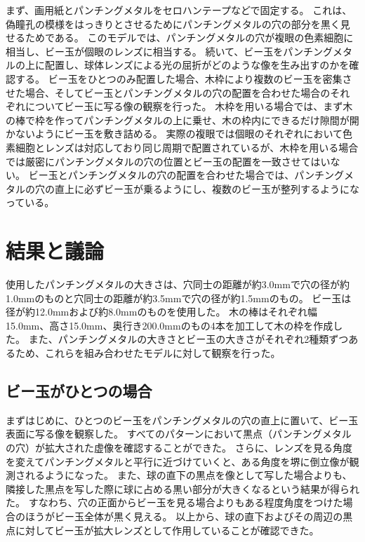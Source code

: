 \noindent
まず、画用紙とパンチングメタルをセロハンテープなどで固定する。
これは、偽瞳孔の模様をはっきりとさせるためにパンチングメタルの穴の部分を黒く見せるためである。
このモデルでは、パンチングメタルの穴が複眼の色素細胞に相当し、ビー玉が個眼のレンズに相当する。
続いて、ビー玉をパンチングメタルの上に配置し、球体レンズによる光の屈折がどのような像を生み出すのかを確認する。
ビー玉をひとつのみ配置した場合、木枠により複数のビー玉を密集させた場合、そしてビー玉とパンチングメタルの穴の配置を合わせた場合のそれぞれについてビー玉に写る像の観察を行った。
木枠を用いる場合では、まず木の棒で枠を作ってパンチングメタルの上に乗せ、木の枠内にできるだけ隙間が開かないようにビー玉を敷き詰める。
実際の複眼では個眼のそれぞれにおいて色素細胞とレンズは対応しており同じ周期で配置されているが、木枠を用いる場合では厳密にパンチングメタルの穴の位置とビー玉の配置を一致させてはいない。
ビー玉とパンチングメタルの穴の配置を合わせた場合では、パンチングメタルの穴の直上に必ずビー玉が乗るようにし、複数のビー玉が整列するようになっている。

\section{結果と議論}
\label{SExperimentResult}

使用したパンチングメタルの大きさは、穴同士の距離が約3.0mmで穴の径が約1.0mmのものと穴同士の距離が約3.5mmで穴の径が約1.5mmのもの。
ビー玉は径が約12.0mmおよび約8.0mmのものを使用した。
木の棒はそれぞれ幅15.0mm、高さ15.0mm、奥行き200.0mmのもの4本を加工して木の枠を作成した。
また、パンチングメタルの大きさとビー玉の大きさがそれぞれ2種類ずつあるため、これらを組み合わせたモデルに対して観察を行った。



\subsection{ビー玉がひとつの場合}
\label{SSOnemarble}
まずはじめに、ひとつのビー玉をパンチングメタルの穴の直上に置いて、ビー玉表面に写る像を観察した。
すべてのパターンにおいて黒点（パンチングメタルの穴）が拡大された虚像を確認することができた\figref{}。
さらに、レンズを見る角度を変えてパンチングメタルと平行に近づけていくと、ある角度を堺に倒立像が観測されるようになった\figref{}。
また、球の直下の黒点を像として写した場合よりも、隣接した黒点を写した際に球に占める黒い部分が大きくなるという結果が得られた\figref{}。
すなわち、穴の正面からビー玉を見る場合よりもある程度角度をつけた場合のほうがビー玉全体が黒く見える。
以上から、球の直下およびその周辺の黒点に対してビー玉が拡大レンズとして作用していることが確認できた。


